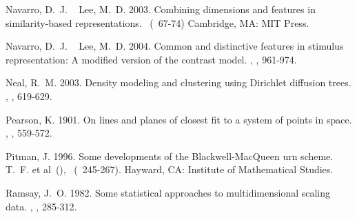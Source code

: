 \documentclass[11pt]{article}
\begin{document}
\begin{thebibliography}{}
%
%
Navarro, D.~J.%
\BCBT{}\ \BBA{} Lee, M.~D.%
%
\newblock{}\BBOP{}2003\BBCP{}.
\newblock{}\BBOQ{}Combining dimensions and features in similarity-based
  representations.\BBCQ{}
\newblock{}\BIn{}  \ (\BPG\ 67-74)
\newblock{}Cambridge, MA: MIT Press.

%
%
Navarro, D.~J.%
\BCBT{}\ \BBA{} Lee, M.~D.%
%
\newblock{}\BBOP{}2004\BBCP{}.
\newblock{}\BBOQ{}Common and distinctive features in stimulus representation: A
  modified version of the contrast model.\BBCQ{}
\newblock{}, , 961-974.

%
%
Neal, R.~M.%
%
\newblock{}\BBOP{}2003\BBCP{}.
\newblock{}\BBOQ{}Density modeling and clustering using {D}irichlet diffusion
  trees.\BBCQ{}
\newblock{}, , 619-629.

%
%
Pearson, K.%
%
\newblock{}\BBOP{}1901\BBCP{}.
\newblock{}\BBOQ{}On lines and planes of closest fit to a system of points in
  space.\BBCQ{}
\newblock{}, , 559-572.

%
%
Pitman, J.%
%
\newblock{}\BBOP{}1996\BBCP{}.
\newblock{}\BBOQ{}Some developments of the {B}lackwell-{M}ac{Q}ueen urn
  scheme.\BBCQ{}
\newblock{}\BIn{} T.~F. et al\ (\BED), \ (\BPG\ 245-267).
\newblock{}Hayward, CA: Institute of Mathematical Studies.

%
%
Ramsay, J.~O.%
%
\newblock{}\BBOP{}1982\BBCP{}.
\newblock{}\BBOQ{}Some statistical approaches to multidimensional scaling
  data.\BBCQ{}
\newblock{},
  , 285-312.


\end{thebibliography}
\end{document}
